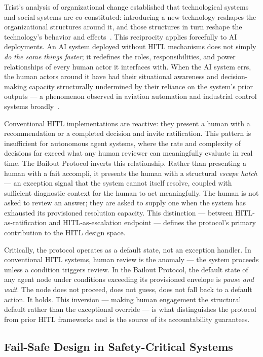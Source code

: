 Trist's analysis of organizational change established that technological systems and social systems are co-constituted: introducing a new technology reshapes the organizational structures around it, and those structures in turn reshape the technology's behavior and effects~\cite{tristr81}. This reciprocity applies forcefully to AI deployments. An AI system deployed without HITL mechanisms does not simply \emph{do the same things faster}; it redefines the roles, responsibilities, and power relationships of every human actor it interfaces with. When the AI system errs, the human actors around it have had their situational awareness and decision-making capacity structurally undermined by their reliance on the system's prior outputs — a phenomenon observed in aviation automation and industrial control systems broadly~\cite{tristr81,bansal2019}.

Conventional HITL implementations are reactive: they present a human with a recommendation or a completed decision and invite ratification. This pattern is insufficient for autonomous agent systems, where the rate and complexity of decisions far exceed what any human reviewer can meaningfully evaluate in real time. The Bailout Protocol inverts this relationship. Rather than presenting a human with a fait accompli, it presents the human with a structural \emph{escape hatch} — an exception signal that the system cannot itself resolve, coupled with sufficient diagnostic context for the human to act meaningfully. The human is not asked to review an answer; they are asked to supply one when the system has exhausted its provisioned resolution capacity. This distinction — between HITL-as-ratification and HITL-as-escalation endpoint — defines the protocol's primary contribution to the HITL design space.

Critically, the protocol operates as a default state, not an exception handler. In conventional HITL systems, human review is the anomaly — the system proceeds unless a condition triggers review. In the Bailout Protocol, the default state of any agent node under conditions exceeding its provisioned envelope is \emph{pause and wait}. The node does not proceed, does not guess, does not fall back to a default action. It holds. This inversion — making human engagement the structural default rather than the exceptional override — is what distinguishes the protocol from prior HITL frameworks and is the source of its accountability guarantees.

\subsection{Fail-Safe Design in Safety-Critical Systems}
\label{sec:failsafe}

